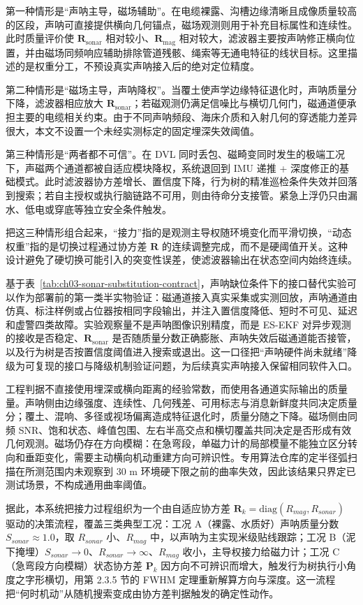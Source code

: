 第一种情形是``声呐主导，磁场辅助''。在电缆裸露、沟槽边缘清晰且成像质量较高的区段，声呐可直接提供横向几何锚点，磁场观测则用于补充目标属性和连续性。此时质量评价使 \(\boldsymbol{R}_{\mathrm{sonar}}\) 相对较小、\(\boldsymbol{R}_{\mathrm{mag}}\) 相对较大，滤波器主要按声呐修正横向位置，并由磁场同频响应辅助排除管道残骸、绳索等无通电特征的线状目标。这里描述的是权重分工，不预设真实声呐接入后的绝对定位精度。

第二种情形是``磁场主导，声呐降权''。当覆土使声学边缘特征退化时，声呐质量分下降，滤波器相应放大 \(\boldsymbol{R}_{\mathrm{sonar}}\)；若磁观测仍满足信噪比与横切几何门，磁通道便承担主要的电缆相关约束。由于不同声呐频段、海床介质和入射几何的穿透能力差异很大，本文不设置一个未经实测标定的固定埋深失效阈值。

第三种情形是``两者都不可信''。在 DVL 同时丢包、磁畸变同时发生的极端工况下，声磁两个通道都被自适应模块降权，系统退回到 IMU 递推 + 深度修正的基础模式。此时滤波器协方差增长、置信度下降，行为树的精准巡检条件失效并回落到搜索；若自主授权或执行脑链路不可用，则由待命分支接管。紧急上浮仍只由漏水、低电或穿底等独立安全条件触发。

把这三种情形组合起来，``接力''指的是观测主导权随环境变化而平滑切换，``动态权重''指的是切换过程通过协方差 \(\boldsymbol{R}\) 的连续调整完成，而不是硬阈值开关。这种设计避免了硬切换可能引入的突变性误差，使滤波器输出在状态空间内始终连续。

基于表~\ref{tab:ch03-sonar-substitution-contract}，声呐缺位条件下的接口替代实验可以作为部署前的第一类半实物验证：磁通道接入真实采集或实测回放，声呐通道由仿真、标注样例或占位器按相同字段输出，并注入置信度降低、短时不可见、延迟和虚警四类故障。实验观察量不是声呐图像识别精度，而是 ES-EKF 对异步观测的接收是否稳定、\(\boldsymbol{R}_{\mathrm{sonar}}\) 是否随质量分数正确膨胀、声呐失效后磁通道能否接管，以及行为树是否按置信度阈值进入搜索或退出。这一口径把``声呐硬件尚未就绪''降级为可复现的接口与降级机制验证问题，为后续真实声呐接入保留相同软件入口。

工程判据不直接使用埋深或横向距离的经验常数，而使用各通道实际输出的质量量。声呐侧由边缘强度、连续性、几何残差、可用标志与消息新鲜度共同决定质量分；覆土、混响、多径或视场偏离造成特征退化时，质量分随之下降。磁场侧由同频 SNR、饱和状态、峰值包围、左右半高交点和横切覆盖共同决定是否形成有效几何观测。磁场仍存在方向模糊：在急弯段，单磁力计的局部模量不能独立区分转向和垂距变化，需要主动横向机动重建方向可辨识性。专用算法仓库的定半径弧扫描在所测范围内未观察到 30 m 环境硬下限之前的曲率失效，因此该结果只界定已测试场景，不构成通用曲率阈值。

据此，本系统把接力过程组织为一个由自适应协方差 \(\boldsymbol{R}_k = \text{diag}(R_{mag}, R_{sonar})\) 驱动的决策流程，覆盖三类典型工况：工况 A（裸露、水质好）声呐质量分数 \(S_{sonar} \approx 1.0\)，取 \(R_{sonar}\) 小、\(R_{mag}\) 中，以声呐为主实现米级贴线跟踪；工况 B（泥下掩埋）\(S_{sonar} \to 0\)、\(R_{sonar} \to \infty\)、\(R_{mag}\) 收小，主导权接力给磁力计；工况 C（急弯段方向模糊）状态协方差 \(\boldsymbol{P}_k\) 因方向不可辨识而增大，触发行为树执行小角度之字形横切，用第 2.3.5 节的 FWHM 定理重新解算方向与深度。这一流程把``何时机动''从随机搜索变成由协方差判据触发的确定性动作。

